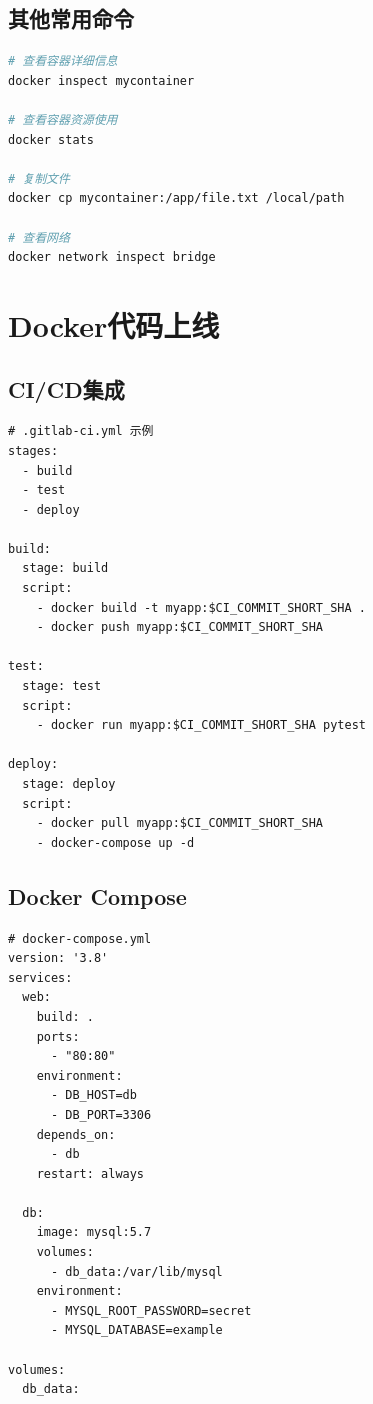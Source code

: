 \documentclass[12pt,UTF8]{ctexbook}
\begin{document}
\subsection{其他常用命令}

\begin{lstlisting}[language=bash]
# 查看容器详细信息
docker inspect mycontainer

# 查看容器资源使用
docker stats

# 复制文件
docker cp mycontainer:/app/file.txt /local/path

# 查看网络
docker network inspect bridge
\end{lstlisting}

\section{Docker代码上线}
\label{sec:docker-deployment}

\subsection{CI/CD集成}

\begin{lstlisting}
# .gitlab-ci.yml 示例
stages:
  - build
  - test
  - deploy

build:
  stage: build
  script:
    - docker build -t myapp:$CI_COMMIT_SHORT_SHA .
    - docker push myapp:$CI_COMMIT_SHORT_SHA

test:
  stage: test
  script:
    - docker run myapp:$CI_COMMIT_SHORT_SHA pytest

deploy:
  stage: deploy
  script:
    - docker pull myapp:$CI_COMMIT_SHORT_SHA
    - docker-compose up -d
\end{lstlisting}

\subsection{Docker Compose}

\begin{lstlisting}
# docker-compose.yml
version: '3.8'
services:
  web:
    build: .
    ports:
      - "80:80"
    environment:
      - DB_HOST=db
      - DB_PORT=3306
    depends_on:
      - db
    restart: always

  db:
    image: mysql:5.7
    volumes:
      - db_data:/var/lib/mysql
    environment:
      - MYSQL_ROOT_PASSWORD=secret
      - MYSQL_DATABASE=example

volumes:
  db_data:
\end{lstlisting}
\end{document}
